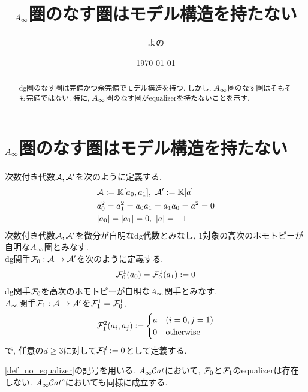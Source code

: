 \documentclass[uplatex, a4paper, 14Q, dvipdfmx]{jsarticle}
\title{\texorpdfstring{$A_{\infty}$}{Ainf}圏のなす圏はモデル構造を持たない}
\author{よの}
\date{\today}
\begin{document}
\maketitle

\begin{abstract}
  dg圏のなす圏は完備かつ余完備でモデル構造を持つ. 
  しかし, $A_{\infty}$圏のなす圏はそもそも完備ではない. 
  特に, $A_{\infty}$圏のなす圏がequalizerを持たないことを示す. 
\end{abstract}

\tableofcontents

\section{\texorpdfstring{$A_{\infty}$}{Ainf}圏のなす圏はモデル構造を持たない}

\begin{definition} \label{def_no_equalizer}
  次数付き代数$\mathcal{A},\mathcal{A}'$を次のように定義する. 
  \begin{align*}
    &\mathcal{A} := \mathbb{K}[a_0,a_1], ~ \mathcal{A}' := \mathbb{K}[a] \\
    &a_0^2 = a_1^2 = a_0 a_1 = a_1 a_0 = a^2 = 0 \\
    &|a_0| = |a_1| = 0, ~ |a| = -1
  \end{align*}
  次数付き代数$\mathcal{A},\mathcal{A}'$を微分が自明なdg代数とみなし, $1$対象の高次のホモトピーが自明な$A_{\infty}$圏とみなす.\\
  dg関手$\mathcal{F}_0 : \mathcal{A} \to \mathcal{A}'$を次のように定義する.
  \begin{align*}
    \mathcal{F}_0^1(a_0) = \mathcal{F}_0^1(a_1) := 0
  \end{align*}
  dg関手$\mathcal{F}_0$を高次のホモトピーが自明な$A_{\infty}$関手とみなす. \\
  $A_{\infty}$関手$\mathcal{F}_1 : \mathcal{A} \to \mathcal{A}'$を$\mathcal{F}_1^1 = \mathcal{F}_0^1$, 
  \begin{align*}
    \mathcal{F}_1^2(a_i,a_j) := 
    \begin{cases}
      a & (i=0, j=1) \\
      0 & \mathrm{otherwise}
    \end{cases}
  \end{align*}
  で, 任意の$d \geq 3$に対して$\mathcal{F}_1^d := 0$として定義する.
\end{definition}

\begin{lemma}
  \cref{def_no_equalizer}の記号を用いる.  
  $A_{\infty}\mathcal{C} at$において, $\mathcal{F}_0$と$\mathcal{F}_1$のequalizerは存在しない. 
  $A_{\infty}\mathcal{C} at^c$においても同様に成立する.
\end{lemma}
\end{document}

